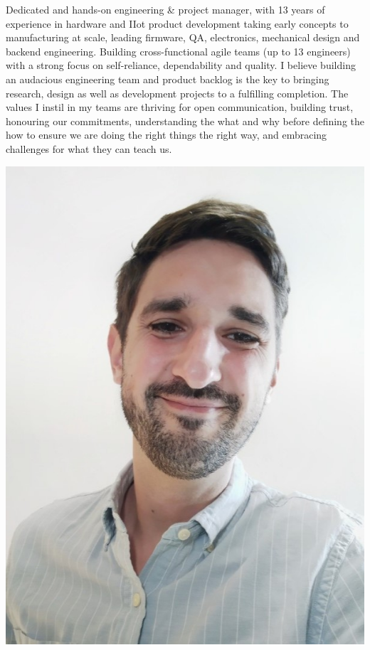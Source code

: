 \documentclass[10pt,a4paper]{moderncv}
\begin{document}
\begin{minipage}{0.8\textwidth}
  Dedicated and hands-on engineering \& project manager, with 13 years of experience in hardware and IIot product development taking early concepts to manufacturing at scale, leading firmware, QA, electronics, mechanical design and backend engineering. Building cross-functional agile teams (up to 13 engineers) with a strong focus on self-reliance, dependability and quality. I believe building an audacious engineering team and product backlog is the key to bringing research, design as well as development projects to a fulfilling completion. The values I instil in my teams are thriving for open communication, building trust, honouring our commitments, understanding the what and why before defining the how to ensure we are doing the right things the right way, and embracing challenges for what they can teach us.
\end{minipage}
\hfill
\begin{minipage}{0.17\textwidth}
  \includegraphics[width=\linewidth]{me}
  \vspace{1em}
\end{minipage}
\end{document}
